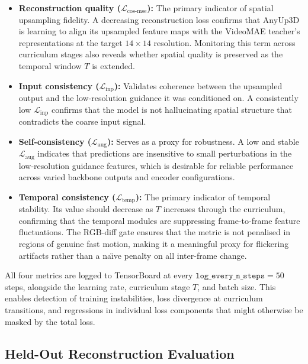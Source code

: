 \begin{itemize}
    \item \textbf{Reconstruction quality ($\mathcal{L}_{\mathrm{cos\text{-}mse}}$):}
    The primary indicator of spatial upsampling fidelity. A decreasing reconstruction
    loss confirms that AnyUp3D is learning to align its upsampled feature maps with
    the VideoMAE teacher's representations at the target $14 \times 14$ resolution.
    Monitoring this term across curriculum stages also reveals whether spatial quality
    is preserved as the temporal window $T$ is extended.

    \item \textbf{Input consistency ($\mathcal{L}_{\mathrm{inp}}$):}
    Validates coherence between the upsampled output and the low-resolution guidance
    it was conditioned on. A consistently low $\mathcal{L}_{\mathrm{inp}}$ confirms
    that the model is not hallucinating spatial structure that contradicts the
    coarse input signal.

    \item \textbf{Self-consistency ($\mathcal{L}_{\mathrm{aug}}$):}
    Serves as a proxy for robustness. A low and stable $\mathcal{L}_{\mathrm{aug}}$
    indicates that predictions are insensitive to small perturbations in the low-resolution
    guidance features, which is desirable for reliable performance across varied backbone
    outputs and encoder configurations.

    \item \textbf{Temporal consistency ($\mathcal{L}_{\mathrm{temp}}$):}
    The primary indicator of temporal stability. Its value should decrease as $T$
    increases through the curriculum, confirming that the temporal modules are
    suppressing frame-to-frame feature fluctuations. The RGB-diff gate ensures
    that the metric is not penalised in regions of genuine fast motion, making it
    a meaningful proxy for flickering artifacts rather than a na\"{\i}ve penalty
    on all inter-frame change.
\end{itemize}

All four metrics are logged to TensorBoard at every $\texttt{log\_every\_n\_steps} = 50$
steps, alongside the learning rate, curriculum stage $T$, and batch size. This enables
detection of training instabilities, loss divergence at curriculum transitions, and
regressions in individual loss components that might otherwise be masked by the total loss.

\subsection{Held-Out Reconstruction Evaluation}

